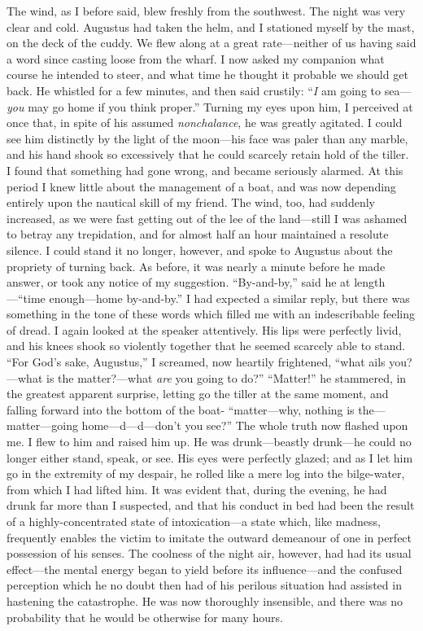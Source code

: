 The wind, as I before said, blew freshly from the southwest. The night was
very clear and cold. Augustus had taken the helm, and I stationed myself by the
mast, on the deck of the cuddy. We flew along at a great rate---neither of us
having said a word since casting loose from the wharf. I now asked my companion
what course he intended to steer, and what time he thought it probable we should
get back. He whistled for a few minutes, and then said crustily: ``\emph{I} am
going to sea---\emph{you} may go home if you think proper.'' Turning my eyes upon
him, I perceived at once that, in spite of his assumed \emph{nonchalance}, he
was greatly agitated. I could see him distinctly by the light of the moon---his
face was paler than any marble, and his hand shook so excessively that he could
scarcely retain hold of the tiller. I found that something had gone wrong, and
became seriously alarmed. At this period I knew little about the management of a
boat, and was now depending entirely upon the nautical skill of my friend. The
wind, too, had suddenly increased, as we were fast getting out of the lee of the
land---still I was ashamed to betray any trepidation, and for almost half an
hour maintained a resolute silence. I could stand it no longer, however, and
spoke to Augustus about the propriety of turning back. As before, it was nearly
a minute before he made answer, or took any notice of my suggestion.
``By-and-by,'' said he at length---``time enough---home by-and-by.'' I had expected
a similar reply, but there was something in the tone of these words which filled
me with an indescribable feeling of dread. I again looked at the speaker
attentively. His lips were perfectly livid, and his knees shook so violently
together that he seemed scarcely able to stand. ``For God's sake, Augustus,'' I
screamed, now heartily frightened, ``what ails you?---what is the matter?---what
\emph{are} you going to do?'' ``Matter!'' he stammered, in the greatest apparent
surprise, letting go the tiller at the same moment, and falling forward into the
bottom of the boat- ``matter---why, nothing is the---matter---going
home---d---d---don't you see?'' The whole truth now flashed upon me. I flew to
him and raised him up. He was drunk---beastly drunk---he could no longer either
stand, speak, or see. His eyes were perfectly glazed; and as I let him go in the
extremity of my despair, he rolled like a mere log into the bilge-water, from
which I had lifted him. It was evident that, during the evening, he had drunk
far more than I suspected, and that his conduct in bed had been the result of a
highly-concentrated state of intoxication---a state which, like madness,
frequently enables the victim to imitate the outward demeanour of one in perfect
possession of his senses. The coolness of the night air, however, had had its
usual effect---the mental energy began to yield before its influence---and the
confused perception which he no doubt then had of his perilous situation had
assisted in hastening the catastrophe. He was now thoroughly insensible, and
there was no probability that he would be otherwise for many hours. 

